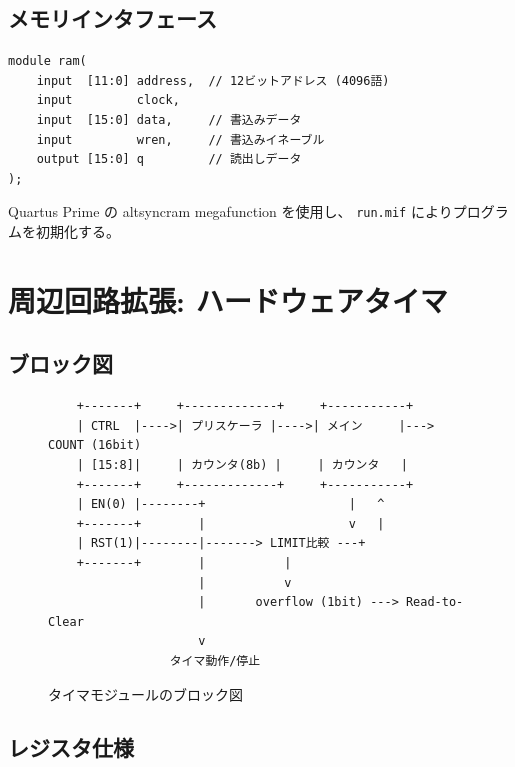 \documentclass[a4paper,11pt]{ltjsarticle}
\begin{document}
\subsection{メモリインタフェース}

\begin{lstlisting}[caption={RAM インタフェース}]
module ram(
    input  [11:0] address,  // 12ビットアドレス (4096語)
    input         clock,
    input  [15:0] data,     // 書込みデータ
    input         wren,     // 書込みイネーブル
    output [15:0] q         // 読出しデータ
);
\end{lstlisting}

Quartus Prime の altsyncram megafunction を使用し、
\texttt{run.mif} によりプログラムを初期化する。


\section{周辺回路拡張: ハードウェアタイマ}

\subsection{ブロック図}

\begin{figure}[h]
\centering
\begin{verbatim}
    +-------+     +-------------+     +-----------+
    | CTRL  |---->| プリスケーラ |---->| メイン     |---> COUNT (16bit)
    | [15:8]|     | カウンタ(8b) |     | カウンタ   |
    +-------+     +-------------+     +-----------+
    | EN(0) |--------+                    |   ^
    +-------+        |                    v   |
    | RST(1)|--------|-------> LIMIT比較 ---+
    +-------+        |           |
                     |           v
                     |       overflow (1bit) ---> Read-to-Clear
                     v
                 タイマ動作/停止
\end{verbatim}
\caption{タイマモジュールのブロック図}
\end{figure}

\subsection{レジスタ仕様}
\end{document}
